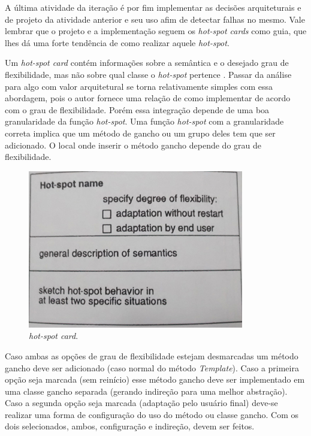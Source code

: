 A última atividade da iteração é por fim implementar as decisões arquiteturais e de projeto da atividade anterior e seu uso afim de detectar falhas no mesmo. Vale lembrar que o projeto e a implementação seguem os \textit{hot-spot cards} como guia, que lhes dá uma forte tendência de como realizar aquele \textit{hot-spot}.

Um \textit{hot-spot card} contém informações sobre a semântica e o desejado grau de flexibilidade, mas não sobre qual classe o \textit{hot-spot} pertence \cite{Fayad1999}. Passar da análise para algo com valor arquitetural se torna relativamente simples com essa abordagem, pois o autor fornece uma relação de como implementar de acordo com o grau de flexibilidade. Porém essa integração depende de uma boa granularidade da função \textit{hot-spot}. Uma função \textit{hot-spot} com a granularidade correta implica que um método de gancho ou um grupo deles tem que ser adicionado. O local onde inserir o método gancho depende do grau de flexibilidade.

\begin{figure}[h]
	\centering
	\label{fig15}
		\includegraphics[keepaspectratio=true,scale=0.4]{figuras/hotspotcard.jpg}
	\caption{\textit{hot-spot card}. \cite{Fayad1999}}
\end{figure}

Caso ambas as opções de grau de flexibilidade estejam desmarcadas um método gancho deve ser adicionado (caso normal do método \textit{Template}). Caso a primeira opção seja marcada (sem reinício) esse método gancho deve ser implementado em uma classe gancho separada (gerando indireção para uma melhor abstração). Caso a segunda opção seja marcada (adaptação pelo usuário final) deve-se realizar uma forma de configuração do uso do método ou classe gancho. Com os dois selecionados, ambos, configuração e indireção, devem ser feitos.

